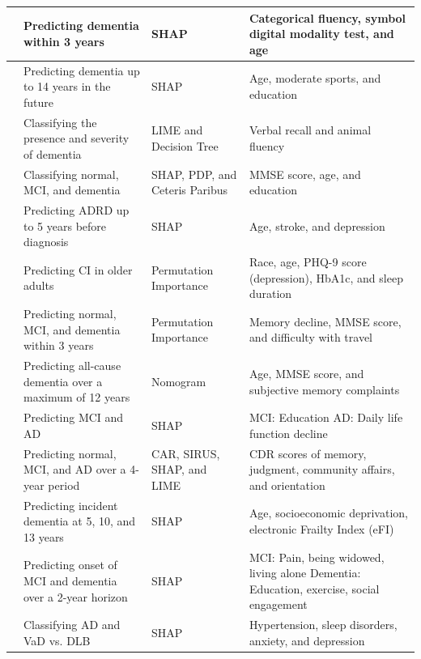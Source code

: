 \begin{longtable}{|M{0.15\textwidth}|M{0.25\textwidth}|M{0.2\textwidth}|M{0.3\textwidth}|}
    \cite{Beebe-Wang2021Efficient} & Predicting dementia within 3 years & SHAP & Categorical fluency, symbol digital modality test, and age \\ \hline
    \cite{Danso2021Developing} & Predicting dementia up to 14 years in the future & SHAP & Age, moderate sports, and education \\ \hline
    \cite{Vyas2022Identifying} & Classifying the presence and severity of dementia & LIME and Decision Tree & Verbal recall and animal fluency \\ \hline
    \cite{Basta2023Personalized} & Classifying normal, MCI, and dementia & SHAP, \acrshort{PDP}, and Ceteris Paribus & MMSE score, age, and education \\ \hline
    \cite{Li2023Early} & Predicting ADRD up to 5 years before diagnosis & SHAP & Age, stroke, and depression \\ \hline
    \cite{Li2023Machine} & Predicting CI in older adults & Permutation Importance & Race, age, PHQ-9 score (depression), HbA1c, and sleep duration \\ \hline
    \cite{Ren2023Improving} & Predicting normal, MCI, and dementia within 3 years & Permutation Importance & Memory decline, MMSE score, and difficulty with travel \\ \hline
    \cite{Twait2023Dementia} & Predicting all-cause dementia over a maximum of 12 years & Nomogram & Age, MMSE score, and subjective memory complaints \\ \hline
    \cite{Yue2023Explainable} & Predicting MCI and AD & SHAP & MCI: Education \newline AD: Daily life function decline \\ \hline
    \cite{abbas2024Explainable} & Predicting normal, MCI, and AD over a 4-year period & CAR, \acrshort{SIRUS}, SHAP, and LIME & CDR scores of memory, judgment, community affairs, and orientation \\ \hline
    \cite{Georgiev2024Predicting} & Predicting incident dementia at 5, 10, and 13 years & SHAP & Age, socioeconomic deprivation, electronic Frailty Index (eFI) \\ \hline
    \cite{Oh2024Multivariable} & Predicting onset of MCI and dementia over a 2-year horizon & SHAP & MCI: Pain, being widowed, living alone \newline Dementia: Education, exercise, social engagement \\ \hline
    \cite{Sharma2024Leveraging} & Classifying AD and VaD vs. DLB & SHAP & Hypertension, sleep disorders, anxiety, and depression \\ \hline

\end{longtable}
